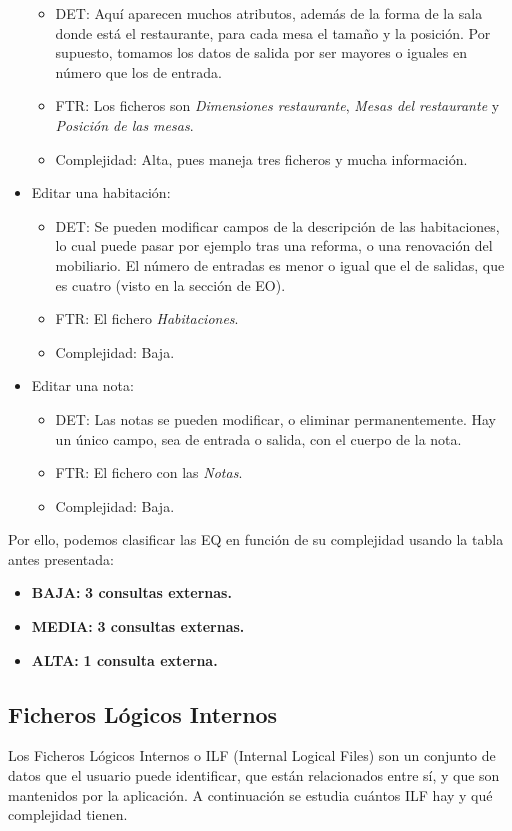 \documentclass[spanish,a4paper,12pt]{report}	%
\begin{document}
\begin{itemize}
\begin{itemize}
 			\item{DET:} Aquí aparecen muchos atributos, además de la forma de la sala donde está el restaurante, para cada mesa el tamaño y la posición. Por supuesto, tomamos los datos de salida por ser mayores o iguales en número que los de entrada.
			\item{FTR:}  Los ficheros son \textit{Dimensiones restaurante}, \textit{Mesas del restaurante} y \textit{Posición de las mesas}.
			\item{Complejidad:} Alta, pues maneja tres ficheros y mucha información.
		\end{itemize}
		\item{Editar una habitación:} 
		\begin{itemize}
 			\item{DET:} Se pueden modificar campos de la descripción de las habitaciones, lo cual puede pasar por ejemplo tras una reforma, o una renovación del mobiliario. El número de entradas es menor o igual que el de salidas, que es cuatro (visto en la sección de EO).
			\item{FTR:} El fichero \textit{Habitaciones}.
			\item{Complejidad:} Baja.
		\end{itemize}
		\item{Editar una nota:} 
		\begin{itemize}
 			\item{DET:} Las notas se pueden modificar, o eliminar permanentemente. Hay un único campo, sea de entrada o salida, con el cuerpo de la nota.
			\item{FTR:} El fichero con las \textit{Notas}.
			\item{Complejidad:} Baja.
		\end{itemize}
	\end{itemize}

	Por ello, podemos clasificar las EQ en función de su complejidad usando la tabla antes presentada:
	\begin{itemize}
	\item{\textbf{BAJA:}} \textbf{3 consultas externas.}
	\item{\textbf{MEDIA:}} \textbf{3 consultas externas.}
	\item{\textbf{ALTA:}} \textbf{1 consulta externa.}
	\end{itemize}


	\subsection{Ficheros Lógicos Internos}
	Los Ficheros Lógicos Internos o ILF (Internal Logical Files) son un conjunto de datos que el usuario puede identificar, que están relacionados entre sí, y que son mantenidos por la aplicación. A continuación se estudia cuántos ILF hay y qué complejidad tienen. 
\end{document}
